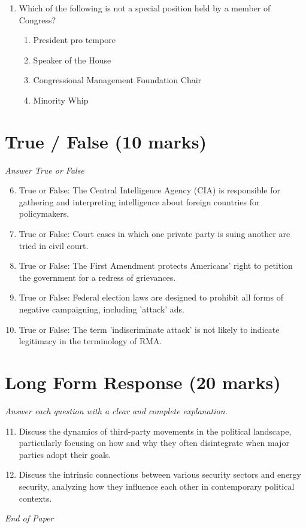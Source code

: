 \documentclass[12pt]{article}
\begin{document}
\begin{enumerate}[label=\arabic*.]
\begin{enumerate}[label=(\alph*)]
    \item A more cooperative international system.
    \item A more competitive international system.
    \item An increase in inter-state alliances and military restraint.
\end{enumerate}
\item Which of the following is not a special position held by a member of Congress?
\begin{enumerate}[label=(\alph*)]
    \item President pro tempore
    \item Speaker of the House
    \item Congressional Management Foundation Chair
    \item Minority Whip
\end{enumerate}
\end{enumerate}

\section*{True / False (10 marks)}
\textit{Answer True or False}
\begin{enumerate}[label=\arabic*.]
\setcounter{enumi}{5}
\item True or False: The Central Intelligence Agency (CIA) is responsible for gathering and interpreting intelligence about foreign countries for policymakers.
\item True or False: Court cases in which one private party is suing another are tried in civil court.
\item True or False: The First Amendment protects Americans' right to petition the government for a redress of grievances.
\item True or False: Federal election laws are designed to prohibit all forms of negative campaigning, including 'attack' ads.
\item True or False: The term 'indiscriminate attack' is not likely to indicate legitimacy in the terminology of RMA.
\end{enumerate}

\section*{Long Form Response (20 marks)}
\textit{Answer each question with a clear and complete explanation.}
\begin{enumerate}[label=\arabic*.]
\setcounter{enumi}{10}
\item Discuss the dynamics of third-party movements in the political landscape, particularly focusing on how and why they often disintegrate when major parties adopt their goals.
\item Discuss the intrinsic connections between various security sectors and energy security, analyzing how they influence each other in contemporary political contexts.
\end{enumerate}

\vfill
\noindent\textit{End of Paper}
\end{document}
